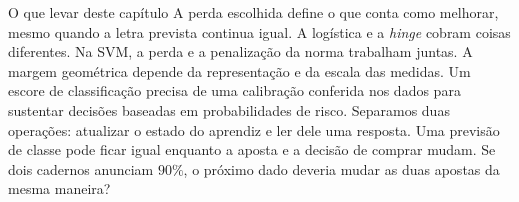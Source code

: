 \begin{quadro}{O que levar deste capítulo}
 A perda escolhida define o que conta como melhorar, mesmo quando a letra prevista continua igual. A logística e a \emph{hinge} cobram coisas diferentes.
 Na SVM, a perda e a penalização da norma trabalham juntas. A margem geométrica depende da representação e da escala das medidas.
 Um escore de classificação precisa de uma calibração conferida nos dados para sustentar decisões baseadas em probabilidades de risco.
 Separamos duas operações: atualizar o estado do aprendiz e ler dele uma resposta. Uma previsão de classe pode ficar igual enquanto a aposta e a decisão de comprar mudam.
 Se dois cadernos anunciam $90\%$, o próximo dado deveria mudar as duas apostas da mesma maneira?
\end{quadro}
